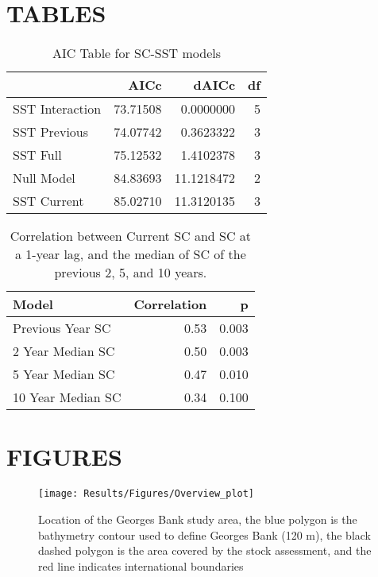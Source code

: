 \documentclass[
]{article}
\begin{document}
\newpage

\clearpage

\hypertarget{ref-tabs}{%
\section{TABLES}\label{ref-tabs}}

\clearpage

\begin{table}

\caption{\label{tab:table-aic}AIC Table for SC-SST models}
\centering
\begin{tabular}[t]{lrrr}
\toprule
  & AICc & dAICc & df\\
\midrule
SST Interaction & 73.71508 & 0.0000000 & 5\\
SST Previous & 74.07742 & 0.3623322 & 3\\
SST Full & 75.12532 & 1.4102378 & 3\\
Null Model & 84.83693 & 11.1218472 & 2\\
SST Current & 85.02710 & 11.3120135 & 3\\
\bottomrule
\end{tabular}
\end{table}

\begin{table}

\caption{\label{tab:table-cor}Correlation between Current SC and SC at a 1-year lag, and the median of SC of the previous 2, 5, and 10 years.}
\centering
\begin{tabular}[t]{lrr}
\toprule
Model & Correlation & p\\
\midrule
Previous Year SC & 0.53 & 0.003\\
2 Year Median SC & 0.50 & 0.003\\
5 Year Median SC & 0.47 & 0.010\\
10 Year Median SC & 0.34 & 0.100\\
\bottomrule
\end{tabular}
\end{table}

\newpage

\clearpage

\hypertarget{ref-figs}{%
\section{FIGURES}\label{ref-figs}}

\begin{figure}[htb]

{\centering \texttt{[image: Results/Figures/Overview\_plot]} 

}

\caption{Location of the Georges Bank study area, the blue polygon is the bathymetry contour used to define Georges Bank (120 m), the black dashed polygon is the area covered by the stock assessment, and the red line indicates international boundaries}\label{fig:Overview}
\end{figure}
\end{document}
